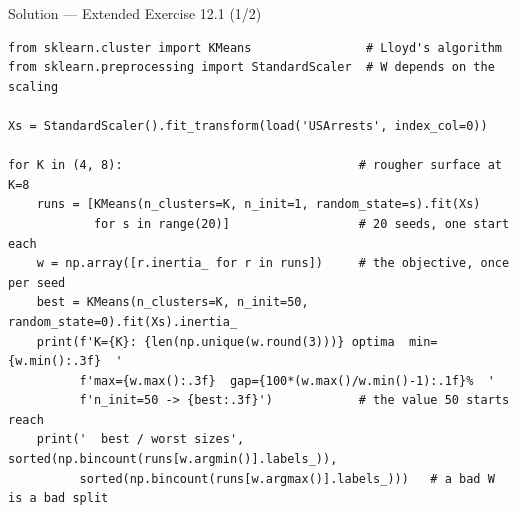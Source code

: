 \documentclass[aspectratio=169,11pt]{beamer}
\begin{document}
\begin{frame}[fragile]{Solution --- Extended Exercise 12.1 (1/2)}
\begin{solutionbox}
\begin{lstlisting}[basicstyle=\ttfamily\scriptsize]
from sklearn.cluster import KMeans                # Lloyd's algorithm
from sklearn.preprocessing import StandardScaler  # W depends on the scaling

Xs = StandardScaler().fit_transform(load('USArrests', index_col=0))

for K in (4, 8):                                 # rougher surface at K=8
    runs = [KMeans(n_clusters=K, n_init=1, random_state=s).fit(Xs)
            for s in range(20)]                  # 20 seeds, one start each
    w = np.array([r.inertia_ for r in runs])     # the objective, once per seed
    best = KMeans(n_clusters=K, n_init=50, random_state=0).fit(Xs).inertia_
    print(f'K={K}: {len(np.unique(w.round(3)))} optima  min={w.min():.3f}  '
          f'max={w.max():.3f}  gap={100*(w.max()/w.min()-1):.1f}%  '
          f'n_init=50 -> {best:.3f}')            # the value 50 starts reach
    print('  best / worst sizes', sorted(np.bincount(runs[w.argmin()].labels_)),
          sorted(np.bincount(runs[w.argmax()].labels_)))   # a bad W is a bad split
\end{lstlisting}
\end{solutionbox}
\end{frame}
\end{document}
